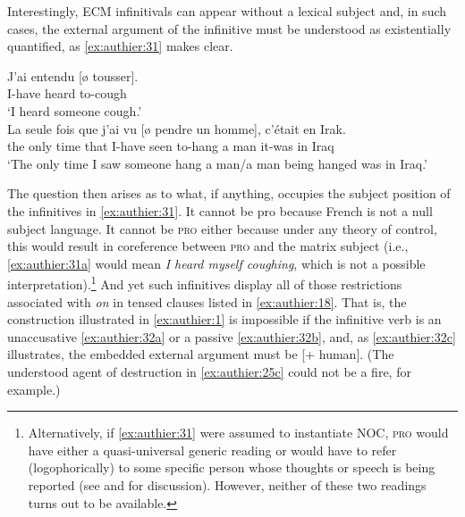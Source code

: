 \documentclass[output=paper,colorlinks,citecolor=brown]{langscibook}
\begin{document}
Interestingly, ECM infinitivals can appear without a lexical subject and, in such cases, the external argument of the infinitive must be understood as existentially quantified, as \ref{ex:authier:31} makes clear.

\begin{exe}
\ex\label{ex:authier:31} 
\begin{xlist}
        \ex\label{ex:authier:31a} 
        \gll   J’ai entendu [ø tousser].\\
               I-have heard {} to-cough\\
        \glt    `I heard someone cough.'\\
        \ex\label{ex:authier:31b} 
        \gll La seule fois que j’ai vu [ø pendre un homme], c’était en Irak.\\
        the only time that I-have seen {} to-hang a man        it-was in Iraq\\
        \glt    `The only time I saw someone hang a man/a man being hanged was in Iraq.'\\
\end{xlist}
\end{exe}

The question then arises as to what, if anything, occupies the subject position of the infinitives in \ref{ex:authier:31}. It cannot be pro because French is not a null subject language. It cannot be \textsc{pro} either because under any theory of control, this would result in coreference between \textsc{pro} and the matrix subject (i.e., \ref{ex:authier:31a} would mean \textit{I heard myself coughing}, which is not a possible interpretation).\footnote{Alternatively, if \ref{ex:authier:31} were assumed to instantiate NOC, \textsc{pro} would have either a quasi-universal generic reading or would have to refer (logophorically) to some specific person whose thoughts or speech is being reported (see \citealt{williams1992a} and \citealt{reed2018a} for discussion). However, neither of these two readings turns out to be available. } And yet such infinitives display all of those restrictions associated with \textit{on} in tensed clauses listed in \ref{ex:authier:18}. That is, the construction illustrated in \ref{ex:authier:1} is impossible if the infinitive verb is an unaccusative \ref{ex:authier:32a} or a passive \ref{ex:authier:32b}, and, as \ref{ex:authier:32c} illustrates, the embedded external argument must be [+ human]. (The understood agent of destruction in \ref{ex:authier:25c} could not be a fire, for example.)
\end{document}
